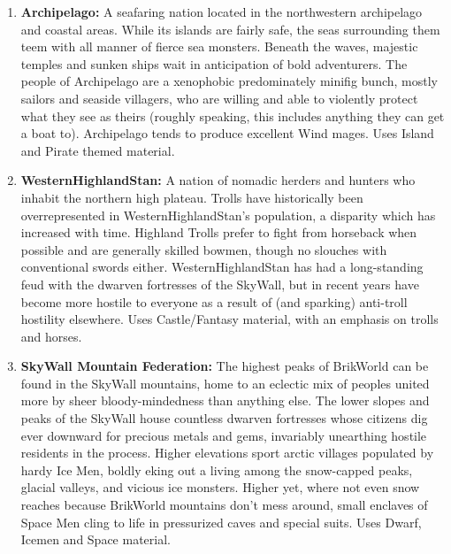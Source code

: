 \documentclass[12pt,a4paper,twocolumn]{article}
\begin{document}
\begin{enumerate}
\item {\bf Archipelago:} A seafaring nation located in the northwestern archipelago and coastal areas.  While its islands are fairly safe, the seas surrounding them teem with all manner of fierce sea monsters.  Beneath the waves, majestic temples and sunken ships wait in anticipation of bold adventurers.  The people of Archipelago are a xenophobic predominately minifig bunch, mostly sailors and seaside villagers, who are willing and able to violently protect what they see as theirs (roughly speaking, this includes anything they can get a boat to).  Archipelago tends to produce excellent Wind mages.  Uses Island and Pirate themed material.

\item {\bf WesternHighlandStan:} A nation of nomadic herders and hunters who inhabit the northern high plateau.  Trolls have historically been overrepresented in WesternHighlandStan's population, a disparity which has increased with time.  Highland Trolls prefer to fight from horseback when possible and are generally skilled bowmen, though no slouches with conventional swords either.  WesternHighlandStan has had a long-standing feud with the dwarven fortresses of the SkyWall, but in recent years have become more hostile to everyone as a result of (and sparking) anti-troll hostility elsewhere.  Uses Castle/Fantasy material, with an emphasis on trolls and horses.

\item {\bf SkyWall Mountain Federation:} The highest peaks of BrikWorld can be found in the SkyWall mountains, home to an eclectic mix of peoples united more by sheer bloody-mindedness than anything else.  The lower slopes and peaks of the SkyWall house countless dwarven fortresses whose citizens dig ever downward for precious metals and gems, invariably unearthing hostile residents in the process.  Higher elevations sport arctic villages populated by hardy Ice Men, boldly eking out a living among the snow-capped peaks, glacial valleys, and vicious ice monsters.  Higher yet, where not even snow reaches because BrikWorld mountains don't mess around, small enclaves of Space Men cling to life in pressurized caves and special suits.  Uses Dwarf, Icemen and Space material.


\end{enumerate}
\end{document}
